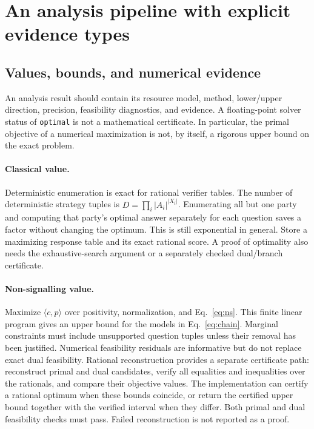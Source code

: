 \section{An analysis pipeline with explicit evidence types}
\label{sec:analysis}

\subsection{Values, bounds, and numerical evidence}
An analysis result should contain its resource model, method, lower/upper
direction, precision, feasibility diagnostics, and evidence. A floating-point
solver status of \texttt{optimal} is not a mathematical certificate. In
particular, the primal objective of a numerical maximization is not, by
itself, a rigorous upper bound on the exact problem.

\paragraph{Classical value.}
Deterministic enumeration is exact for rational verifier tables. The number
of deterministic strategy tuples is
$D=\prod_i |A_i|^{|X_i|}$. Enumerating all but one party and computing that
party's optimal answer separately for each question saves a factor without
changing the optimum. This is still exponential in general. Store a maximizing
response table and its exact rational score. A proof of optimality also needs
the exhaustive-search argument or a separately checked dual/branch certificate.

\paragraph{Non-signalling value.}
Maximize $\langle c,p\rangle$ over positivity, normalization, and
Eq.~\eqref{eq:ns}. This finite linear program gives an upper bound for the
models in Eq.~\eqref{eq:chain}. Marginal constraints must include unsupported
question tuples unless their removal has been justified. Numerical feasibility
residuals are informative but do not replace exact dual feasibility. Rational
reconstruction provides a separate certificate path: reconstruct primal and
dual candidates, verify all equalities and inequalities over the rationals,
and compare their objective values. The implementation can certify a rational
optimum when these bounds coincide, or return the certified upper bound
together with the verified interval when they differ. Both primal and dual
feasibility checks must pass. Failed reconstruction is not reported as a proof.

